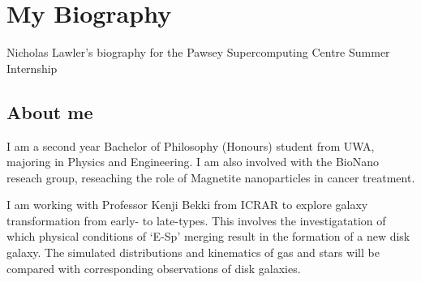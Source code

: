 \section{My Biography}
Nicholas Lawler's biography for the Pawsey Supercomputing Centre Summer Internship
\subsection{About me}
I am a second year Bachelor of Philosophy (Honours) student from UWA, majoring in Physics and Engineering. I am also involved with the BioNano reseach group, reseaching the role of Magnetite nanoparticles in cancer treatment. 

I am working with Professor Kenji Bekki from ICRAR to explore galaxy transformation from early- to late-types. This involves the investigatation of which physical conditions of `E-Sp’ merging result in the formation of a new disk galaxy. The simulated distributions and kinematics of gas and stars will be compared with corresponding observations of disk galaxies.
